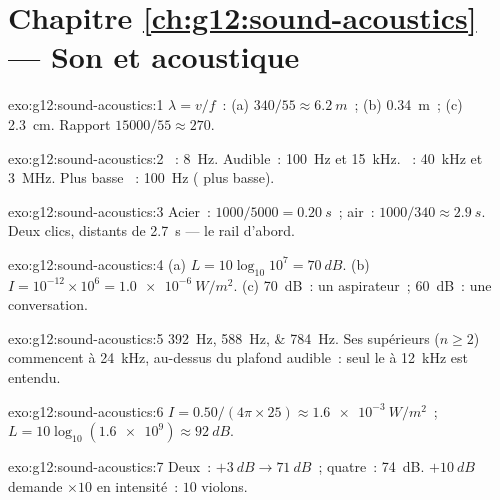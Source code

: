 \section*{Chapitre \ref{ch:g12:sound-acoustics} --- Son et acoustique}

\begin{solution}{exo:g12:sound-acoustics:1}
$\lambda = v/f$~: (a) $340/55 \approx \qty{6.2}{m}$~; (b)
\qty{0.34}{m}~; (c) \qty{2.3}{cm}. Rapport $15000/55 \approx 270$.
\end{solution}

\begin{solution}{exo:g12:sound-acoustics:2}
~: \qty{8}{Hz}. Audible~: \qty{100}{Hz} et \qty{15}{kHz}.
~: \qty{40}{kHz} et \qty{3}{MHz}. Plus basse
~: \qty{100}{Hz} ( plus basse).
\end{solution}

\begin{solution}{exo:g12:sound-acoustics:3}
Acier~: $1000/5000 = \qty{0.20}{s}$~; air~: $1000/340 \approx
\qty{2.9}{s}$. Deux clics, distants de \qty{2.7}{s} --- le rail d'abord.
\end{solution}

\begin{solution}{exo:g12:sound-acoustics:4}
(a) $L = 10\log_{10}10^{7} = \qty{70}{dB}$. (b) $I = 10^{-12} \times
10^{6} = \qty{1.0e-6}{W/m^2}$. (c) \qty{70}{dB}~: un aspirateur~;
\qty{60}{dB}~: une conversation.
\end{solution}

\begin{solution}{exo:g12:sound-acoustics:5}
\qtylist{392;588;784}{Hz}. Ses  supérieurs ($n \ge 2$)
commencent à \qty{24}{kHz}, au-dessus du plafond audible~: seul le
 à \qty{12}{kHz} est entendu.
\end{solution}

\begin{solution}{exo:g12:sound-acoustics:6}
$I = 0.50/(4\pi \times 25) \approx \qty{1.6e-3}{W/m^2}$~;
$L = 10\log_{10}(\num{1.6e9}) \approx \qty{92}{dB}$.
\end{solution}

\begin{solution}{exo:g12:sound-acoustics:7}
Deux~: $+\qty{3}{dB} \to \qty{71}{dB}$~; quatre~: \qty{74}{dB}.
$+\qty{10}{dB}$ demande $\times 10$ en intensité~: $10$ violons.
\end{solution}

